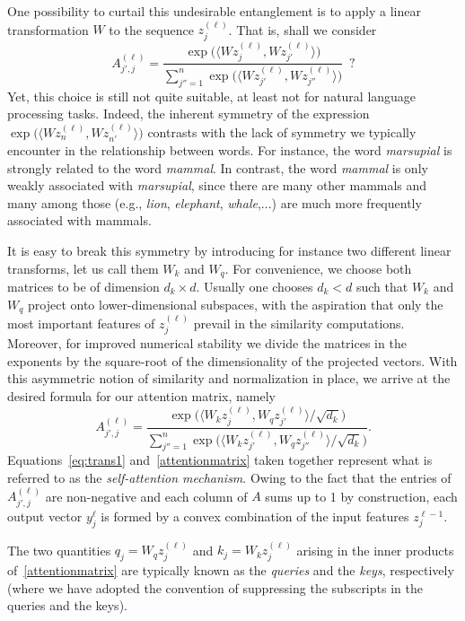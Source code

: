 One possibility to
curtail this undesirable entanglement is to  apply  a linear transformation $W$ to the sequence $z_j^{(\ell)}$. That is, shall we consider
$$
A_{j',j}^{(\ell)} = \frac{\exp\big(\langle W z_{j}^{(\ell)}, W z_{j'}^{(\ell)} \rangle\big)}{\sum_{j''=1}^n \exp\big(\langle W z_{j'}^{(\ell)}, W z_{j''}^{(\ell)} \rangle\big)}\,\,\, ?
$$
Yet, this choice is still not quite suitable, at least not for natural language processing tasks. Indeed, the inherent symmetry of the expression $\exp\big(\langle W z_{n}^{(\ell)} , W z_{n'}^{(\ell)} \rangle\big)$ contrasts with the lack of symmetry we typically encounter in the relationship between words. For instance, the word {\em marsupial} is strongly related to the word {\em mammal}. In contrast, the word {\em mammal} is only weakly associated with {\em marsupial}, since there are many other mammals and many among those  (e.g., {\em lion}, {\em elephant}, {\em whale},...) are much more frequently associated with mammals.

It is easy to break this symmetry by introducing for instance two different linear transforms, let us call them $W_{k}$ and $W_q$. For convenience, we choose both matrices to be of dimension $d_k \times d$. Usually one chooses $d_k < d$ such that $W_k$ and $W_q$ project onto lower-dimensional subspaces, with the aspiration that only the most important features of $z_j^{(\ell)}$ prevail in the similarity computations. 
Moreover, for improved numerical stability we divide the matrices in the exponents by the square-root of the dimensionality of the projected vectors. 
With this asymmetric notion of similarity and normalization in place, we arrive at the desired formula for our attention matrix, namely
\begin{equation}
\label{attentionmatrix}   
A_{j',j}^{(\ell)} = \frac{\exp\big(\langle W_k z_{j}^{(\ell)}, W_q z_{j'}^{(\ell)} \rangle /\sqrt{d_k}\big)}{\sum_{j''=1}^n \exp\big(\langle W_k z_{j'}^{(\ell)}, W_q z_{j''}^{(\ell)} \rangle /\sqrt{d_k}\big)}.
\end{equation}
Equations~\eqref{eq:trans1} and~\eqref{attentionmatrix}
taken together represent what is referred to as the {\em self-attention mechanism}.  Owing to the fact that the entries of $A_{j',j}^{(\ell)}$ are non-negative and each column of $A$ sums up to 1 by construction, 
each output vector $y_j^{\ell}$ is formed by a convex combination of the input features $z_j^{\ell-1}$.

The two quantities $q_j = W_q z_j^{(\ell)}$ and $k_j = W_k z_j^{(\ell)}$ arising in the inner products of~\eqref{attentionmatrix} are typically known as the {\em queries} and the {\em keys}, respectively (where we have adopted the convention of suppressing the subscripts in the queries and the keys).







